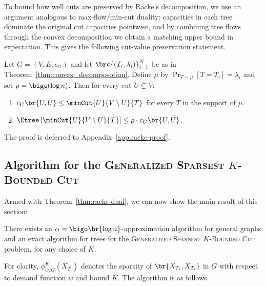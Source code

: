 To bound how well cuts are preserved by R\"{a}cke's decomposition, we use an argument analogous to max-flow/min-cut duality: capacities in each tree dominate the original cut capacities pointwise, and by combining tree flows through the convex decomposition we obtain a matching upper bound in expectation.
This gives the following cut-value preservation statement.
\begin{theorem}\label{thm:racke-dual}
Let $G=(V,E,c_G)$ and let $\brc{(T_i,\lambda_i)}_{i=1}^{N}$ be as in Theorem~\ref{thm:convex_decomposotion}.
Define $\mu$ by $\Pr_{T\sim\mu}[T=T_i]=\lambda_i$ and set
$\rho=\bigo(\log n)$. Then for every cut $U\subsetneq V$:
\begin{enumerate}
  \item[(i)] $c_G\br{U,\bar{U}}\le \minCut{U}{V\setminus U}{T}$ for every $T$ in the support of $\mu$.
  \item[(ii)] $\Etree\left[\minCut{U}{V\setminus U}{T}\right]\le \rho\cdot c_G\br{U,\bar{U}}$.
\end{enumerate}
The proof is deferred to Appendix~\ref{app:racke-proof}.
\end{theorem}

\subsection{Algorithm for the \textsc{Generalized Sparsest $K$-Bounded Cut}}

Armed with Theorem~\ref{thm:racke-dual}, we can now show the main result of this section:
\begin{theorem} \label{thm:phiK}
  There exists an $\alpha=\bigo\br{\log n}$-approximation algorithm for general graphs and an exact algorithm for trees for the \textsc{Generalized Sparsest $K$-Bounded Cut} problem, for any choice of $K$.
\end{theorem}

For clarity, $\phi_{w,G}^K(X_{T_i})$ denotes the sparsity of $\br{X_{T_i},\bar{X}_{T_i}}$ in $G$ with respect to demand function $w$ and bound $K$. The algorithm is as follows.



